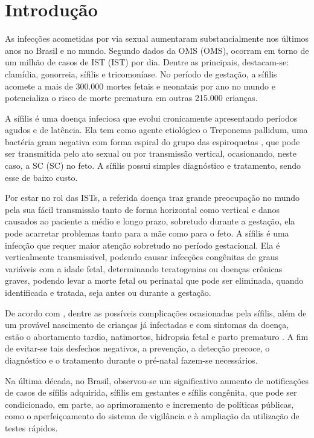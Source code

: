 \chapter{Introdução}
\label{cap:introducao}

As infecções acometidas por via sexual aumentaram substancialmente nos últimos anos no Brasil e no mundo. Segundo dados da \acrlong{OMS} (\acrshort{OMS}), ocorram em torno de um milhão de casos de \acrlong{IST} (\acrshort{IST}) por dia. Dentre as principais, destacam-se: clamídia, gonorreia, sífilis e tricomoníase. No período de gestação, a sífilis acomete a mais de 300.000 mortes fetais e neonatais por ano no mundo e potencializa o risco de morte prematura em outras 215.000 crianças. \cite{boletim2018}

A sífilis é uma doença infeciosa que evolui cronicamente apresentando períodos agudos e de latência. Ela tem como agente etiológico o Treponema pallidum, uma bactéria gram negativa com forma espiral do grupo das espiroquetas \cite{mendes2005microbiologia}, que pode ser transmitida pelo ato sexual ou por transmissão vertical, ocasionando, neste caso, a \acrlong{SC} (\acrshort{SC}) no feto. A sífilis possui simples diagnóstico e tratamento, sendo esse de baixo custo. \cite{brasilprenatal}

Por estar no rol das \acrshort{IST}s, a referida doença traz grande preocupação no mundo pela sua fácil transmissão tanto de forma horizontal como vertical e danos causados ao paciente a médio e longo prazo, sobretudo durante a gestação, ela pode acarretar problemas tanto para a mãe como para o feto. A sífilis é uma infecção que requer maior atenção sobretudo no período gestacional. Ela é verticalmente transmissível, podendo causar infecções congênitas de graus variáveis com a idade fetal, determinando teratogenias ou doenças crônicas graves, podendo levar a morte fetal ou perinatal que pode ser eliminada, quando identificada e tratada, seja antes ou durante a gestação. \cite{avelleira2006}

De acordo com \cite{brasilprenatal}, dentre as possíveis complicações ocasionadas pela sífilis, além de um provável nascimento de crianças já infectadas e com sintomas da doença, estão o abortamento tardio, natimortos, hidropsia fetal e parto prematuro \cite{brasilprenatal}. A fim de evitar-se tais desfechos negativos, a prevenção, a detecção precoce, o diagnóstico e o tratamento durante o pré-natal fazem-se necessários.

Na última década, no Brasil, observou-se um significativo aumento de notificações de casos de sífilis adquirida, sífilis em gestantes e sífilis congênita, que pode ser condicionado, em parte, ao aprimoramento e incremento de políticas públicas, como o aperfeiçoamento do sistema de vigilância e à ampliação da utilização de testes rápidos. \cite{boletim2018}

